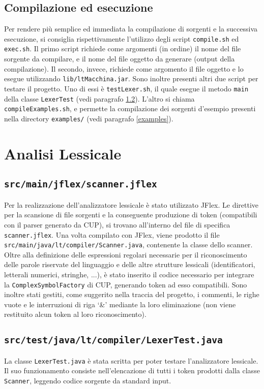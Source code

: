 \documentclass[10pt,a4paper]{article}
\begin{document}
\subsection{Compilazione ed esecuzione}
Per rendere più semplice ed immediata la compilazione di sorgenti e la successiva esecuzione, si consiglia rispettivamente l'utilizzo degli script \texttt{compile.sh} ed \texttt{exec.sh}.
Il primo script richiede come argomenti (in ordine) il nome del file sorgente da compilare, e il nome del file oggetto da generare (output della compilazione).
Il secondo, invece, richiede come argomento il file oggetto e lo esegue utilizzando \texttt{lib/ltMacchina.jar}.
Sono inoltre presenti altri due script per testare il progetto.
Uno di essi è \texttt{testLexer.sh}, il quale esegue il metodo \texttt{main} della classe \texttt{LexerTest} (vedi paragrafo \ref{testLexer}).
L'altro si chiama \texttt{compileExamples.sh}, e permette la compilazione dei sorgenti d'esempio presenti nella directory \texttt{examples/} (vedi paragrafo \ref{examples}).

\section{Analisi Lessicale} \label{analisiLessicale}

\subsection{\texttt{src/main/jflex/scanner.jflex}} \label{lexer}
Per la realizzazione dell'analizzatore lessicale è stato utilizzato JFlex. Le direttive per la scansione di file sorgenti e la conseguente produzione di token (compatibili con il parser generato da CUP), si trovano all'interno del file di specifica \texttt{scanner.jflex}.
Una volta compilato con JFlex, viene prodotto il file \texttt{src/main/java/lt/compiler/Scanner.java}, contenente la classe dello scanner.
Oltre alla definizione delle espressioni regolari necessarie per il riconoscimento delle parole riservate del linguaggio e delle altre strutture lessicali (identificatori, letterali numerici, stringhe, ...), è stato inserito il codice necessario per integrare la \texttt{ComplexSymbolFactory} di CUP, generando token ad esso compatibili.
Sono inoltre stati gestiti, come suggerito nella traccia del progetto, i commenti, le righe vuote e le interruzioni di riga `\&' mediante la loro eliminazione (non viene restituito alcun token al loro riconoscimento).

\subsection{\texttt{src/test/java/lt/compiler/LexerTest.java}} \label{testLexer}
La classe \texttt{LexerTest.java} è stata scritta per poter testare l'analizzatore lessicale.
Il suo funzionamento consiste nell'elencazione di tutti i token prodotti dalla classe \texttt{Scanner}, leggendo codice sorgente da standard input.
\end{document}
